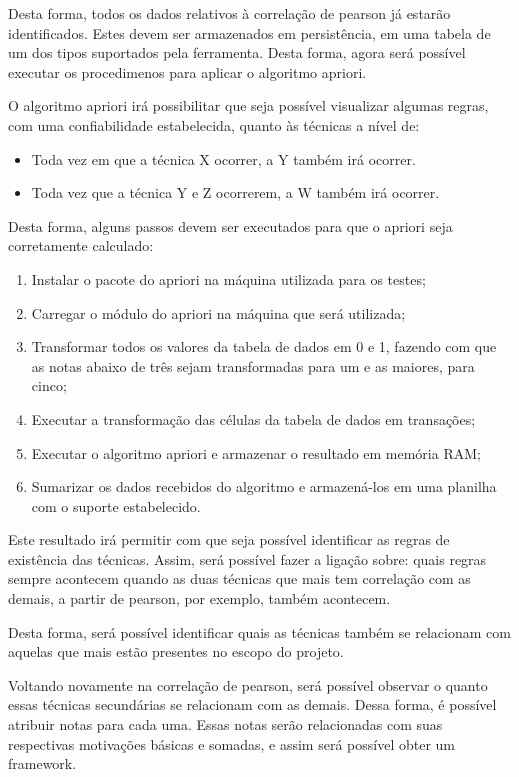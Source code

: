 Desta forma, todos os dados relativos à correlação de pearson já estarão identificados. Estes devem ser armazenados em persistência,
em uma tabela de um dos tipos suportados pela ferramenta. Desta forma, agora será possível executar os procedimenos para aplicar
o algoritmo apriori.

O algoritmo apriori irá possibilitar que seja possível visualizar algumas regras, com uma confiabilidade estabelecida,
quanto às técnicas a nível de:
\begin{itemize}
    \item Toda vez em que a técnica X ocorrer, a Y também irá ocorrer.
    \item Toda vez que a técnica Y e Z ocorrerem, a W também irá ocorrer.
\end{itemize}

Desta forma, alguns passos devem ser executados para que o apriori seja corretamente calculado:

\begin{enumerate}
    \item Instalar o pacote do apriori na máquina utilizada para os testes;
    \item Carregar o módulo do apriori na máquina que será utilizada;
    \item Transformar todos os valores da tabela de dados em 0 e 1, fazendo com que as notas abaixo de três
        sejam transformadas para um e as maiores, para cinco;
    \item Executar a transformação das células da tabela de dados em transações;
    \item Executar o algoritmo apriori e armazenar o resultado em memória RAM;
    \item Sumarizar os dados recebidos do algoritmo e armazená-los em uma planilha com o suporte
        estabelecido.
\end{enumerate}

Este resultado irá permitir com que seja possível identificar as regras de existência das técnicas. Assim, será possível fazer
a ligação sobre: quais regras sempre acontecem quando as duas técnicas que mais tem correlação com as demais, a partir de pearson,
por exemplo, também acontecem.


Desta forma, será possível identificar quais as técnicas também se relacionam com aquelas que mais estão presentes no escopo do
projeto.

Voltando novamente na correlação de pearson, será possível observar o quanto essas técnicas secundárias se relacionam com as demais. 
Dessa forma, é possível atribuir notas para cada uma. Essas notas serão relacionadas com suas respectivas motivações básicas e somadas, e assim
será possível obter um framework.

